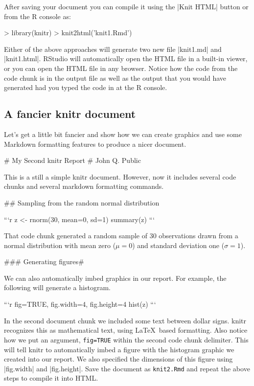 After saving your document you can compile it using the |Knit HTML| button or from the R console as:
\begin{R}
> library(knitr)
> knit2html('knit1.Rmd')
\end{R}
%
Either of the above approaches will generate two new file |knit1.md| and |knit1.html|. RStudio will automatically open the HTML file in a built-in viewer, or you can open the HTML file in any browser. Notice how the code from the code chunk is in the output file as well as the output that you would have generated had you typed the code in at the R console.


\subsection{A fancier knitr document}

Let's get a little bit fancier and show how we can create graphics and
use some Markdown formatting features to produce a nicer document.
%
\begin{codeblock}
# My Second knitr Report
# John Q. Public

This is a still a simple knitr document. However,
now it includes several code chunks and several
markdown formatting commands.

## Sampling from the random normal distribution

```{r}
z <- rnorm(30, mean=0, sd=1)
summary(z)
```

That code chunk generated a random sample of 30
observations drawn from a normal distribution with mean
zero ($\mu = 0$) and standard deviation one ($\sigma = 1$).


### Generating figures#

We can also automatically imbed graphics in our
report. For example, the following will generate
a histogram.

```{r fig=TRUE, fig.width=4, fig.height=4}
hist(z)
```
\end{codeblock}

In the second document chunk we included some text between dollar signs.  knitr recognizes this as mathematical text, using \LaTeX\ based formatting. Also notice how we put an argument, \lstinline!fig=TRUE! within the second
code chunk delimiter. This will tell knitr to automatically imbed a
figure with the histogram graphic we created into our report.  We also specified the dimensions of this figure using |fig.width| and |fig.height|.  Save the document
as \lstinline!knit2.Rmd! and repeat the above steps to compile it into HTML.


